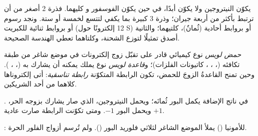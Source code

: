 \begin{remark}\label{rem:b1:lewis-resonance-vsepr:hypervalent}
يكوّن النيتروجين  ولا يكوّن  أبدًا، في حين يكوّن الفوسفور
 و كليهما. فذرة  2 أصغر من أن ترتبط بأكثر من
أربعة جيران؛ وذرة  3 كبيرة بما يكفي لتتسع لخمسة أو ستة.
ونجد رسوم  أو  بروابط ثنائية للكبريت (12
إلكترونًا حول S) أو بروابط أحادية  (ثُمانٌ)،
كلتيهما؛ والثانية أصدق تمثيلًا لتوزع الشحنة، وكلتاهما
تعطي الهندسة الصحيحة.
\end{remark}

\begin{definition}\label{def:b1:lewis-resonance-vsepr:lewis-acid}
\emph{حمض لويس} نوع كيميائي قادر على تقبّل
زوج إلكترونات في موضع شاغر من طبقة تكافئه (،
، ، كاتيونات الفلزات)؛ و\emph{قاعدة لويس}
نوع يملك  يمكنه أن يشارك به (، ،
). وحين تمنح القاعدةُ الزوجَ للحمض، تكون الرابطة المتكوّنة
\emph{رابطة تناسقية}:  أتى
إلكتروناها كلاهما من أحد الشريكين.
\end{definition}

\begin{example}\label{ex:b1:lewis-resonance-vsepr:adduct}
. في ناتج الإضافة يكمل البور ثُمانَه؛
ويحمل النيتروجين، الذي صار يشارك بزوجه الحر، 
$+1$ ويحمل البور $-1$. ومتى تكوّنت الرابطة  صارت  عادية.
\end{example}

\begin{omfigure}

{\small {}:  للأمونيا () يملأ
الموضع الشاغر لثلاثي فلوريد البور (). ولم تُرسم أزواج الفلور
الحرة.}
\end{omfigure}

